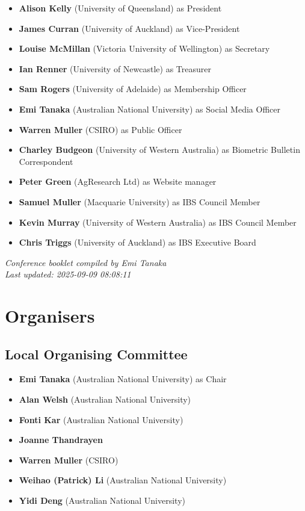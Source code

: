 \documentclass[
]{scrreprt}
\providecommand{\tightlist}{%
  \setlength{\itemsep}{0pt}\setlength{\parskip}{0pt}}\usepackage{longtable,booktabs,array}
\begin{document}
\begin{itemize}
\tightlist
\item
  \textbf{Alison Kelly} (University of Queensland) as President
\item
  \textbf{James Curran} (University of Auckland) as Vice-President
\item
  \textbf{Louise McMillan} (Victoria University of Wellington) as
  Secretary
\item
  \textbf{Ian Renner} (University of Newcastle) as Treasurer
\item
  \textbf{Sam Rogers} (University of Adelaide) as Membership Officer
\item
  \textbf{Emi Tanaka} (Australian National University) as Social Media
  Officer
\item
  \textbf{Warren Muller} (CSIRO) as Public Officer
\item
  \textbf{Charley Budgeon} (University of Western Australia) as
  Biometric Bulletin Correspondent
\item
  \textbf{Peter Green} (AgResearch Ltd) as Website manager
\item
  \textbf{Samuel Muller} (Macquarie University) as IBS Council Member
\item
  \textbf{Kevin Murray} (University of Western Australia) as IBS Council
  Member
\item
  \textbf{Chris Triggs} (University of Auckland) as IBS Executive Board
\end{itemize}

\vfill

\emph{Conference booklet compiled by Emi Tanaka}\\
\emph{Last updated: 2025-09-09 08:08:11}

\chapter{Organisers}\label{organisers}

\section{Local Organising Committee}\label{local-organising-committee}

\begin{itemize}
\tightlist
\item
  \textbf{Emi Tanaka} (Australian National University) as Chair
\item
  \textbf{Alan Welsh} (Australian National University)
\item
  \textbf{Fonti Kar} (Australian National University)
\item
  \textbf{Joanne Thandrayen}
\item
  \textbf{Warren Muller} (CSIRO)
\item
  \textbf{Weihao (Patrick) Li} (Australian National University)
\item
  \textbf{Yidi Deng} (Australian National University)
\end{itemize}
\end{document}
